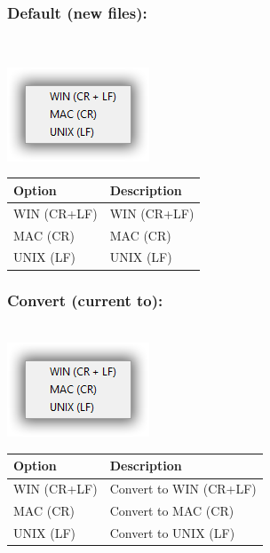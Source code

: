 \newpage
\hypertarget{menu_format_eol_default}{}
\subsubsection{Default (new files):}\\

\includegraphics[scale=0.50]{./res/eol.png}\\

\begin{scriptsize}
  \begin{tabularx}{\textwidth}{>{\hsize=0.3\hsize}X>{\hsize=0.7\hsize}X}\\
    \hline
    \textbf{Option} & \textbf{Description} \\
    \hline
    WIN (CR+LF) & WIN (CR+LF) \\
    MAC (CR) & MAC (CR) \\
    UNIX (LF) & UNIX (LF) \\
    \hline
  \end{tabularx}
\end{scriptsize}


\hypertarget{menu_format_eol_convert}{}
\subsubsection{Convert (current to):}\\

\includegraphics[scale=0.50]{./res/eol.png}\\

\begin{scriptsize}
  \begin{tabularx}{\textwidth}{>{\hsize=0.3\hsize}X>{\hsize=0.7\hsize}X}\\
    \hline
    \textbf{Option} & \textbf{Description} \\
    \hline
    WIN (CR+LF) & Convert to WIN (CR+LF) \\
    MAC (CR) & Convert to MAC (CR) \\
    UNIX (LF) & Convert to UNIX (LF) \\
    \hline
  \end{tabularx}
\end{scriptsize}


